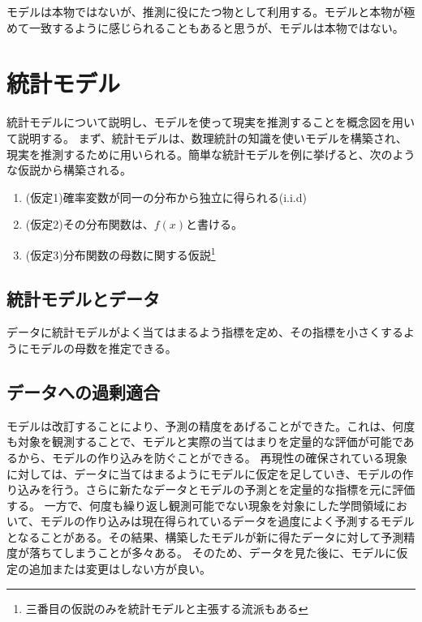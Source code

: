 
モデルは本物ではないが、推測に役にたつ物として利用する。モデルと本物が極めて一致するように感じられることもあると思うが、モデルは本物ではない。



\section{統計モデル}
統計モデルについて説明し、モデルを使って現実を推測することを概念図を用いて説明する。
まず、統計モデルは、数理統計の知識を使いモデルを構築され、現実を推測するために用いられる。簡単な統計モデルを例に挙げると、次のような仮説から構築される。

\begin{enumerate}
    \item (仮定1)確率変数が同一の分布から独立に得られる(i.i.d)
    \item (仮定2)その分布関数は、$f(x)$と書ける。
    \item (仮定3)分布関数の母数に関する仮説\footnote{三番目の仮説のみを統計モデルと主張する流派もある\cite{塩見_正衛2021}}
\end{enumerate}

\subsection{統計モデルとデータ}
データに統計モデルがよく当てはまるよう指標を定め、その指標を小さくするようにモデルの母数を推定できる。



\subsection{データへの過剰適合}
モデルは改訂することにより、予測の精度をあげることができた。これは、何度も対象を観測することで、モデルと実際の当てはまりを定量的な評価が可能であるから、モデルの作り込みを防ぐことができる。
再現性の確保されている現象に対しては、データに当てはまるようにモデルに仮定を足していき、モデルの作り込みを行う。さらに新たなデータとモデルの予測とを定量的な指標を元に評価する。
一方で、何度も繰り返し観測可能でない現象を対象にした学問領域において、モデルの作り込みは現在得られているデータを過度によく予測するモデルとなることがある。その結果、構築したモデルが新に得たデータに対して予測精度が落ちてしまうことが多々ある。
そのため、データを見た後に、モデルに仮定の追加または変更はしない方が良い。




